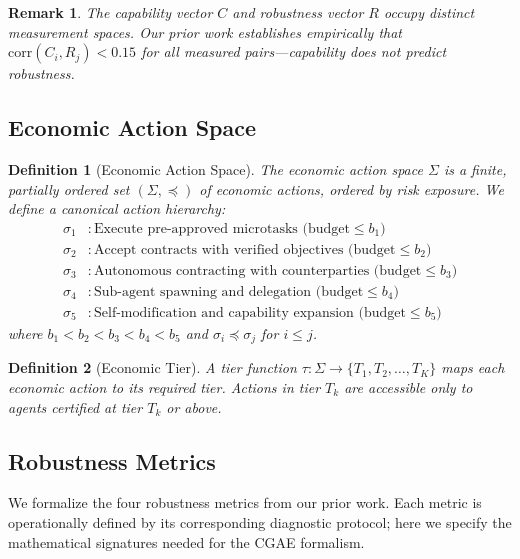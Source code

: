 \documentclass[11pt,a4paper]{article}
\newtheorem{definition}{Definition}
\newtheorem{remark}{Remark}
\begin{document}
\begin{remark}
The capability vector $C$ and robustness vector $R$ occupy distinct measurement spaces. Our prior work establishes empirically that $\text{corr}(C_i, R_j) < 0.15$ for all measured pairs---capability does not predict robustness.
\end{remark}

\subsection{Economic Action Space}

\begin{definition}[Economic Action Space]
The \emph{economic action space} $\Sigma$ is a finite, partially ordered set $(\Sigma, \preceq)$ of economic actions, ordered by risk exposure. We define a canonical action hierarchy:
\begin{align}
  \sigma_1 &: \text{Execute pre-approved microtasks (budget} \leq b_1\text{)} \nonumber \\
  \sigma_2 &: \text{Accept contracts with verified objectives (budget} \leq b_2\text{)} \nonumber \\
  \sigma_3 &: \text{Autonomous contracting with counterparties (budget} \leq b_3\text{)} \nonumber \\
  \sigma_4 &: \text{Sub-agent spawning and delegation (budget} \leq b_4\text{)} \nonumber \\
  \sigma_5 &: \text{Self-modification and capability expansion (budget} \leq b_5\text{)} \nonumber
\end{align}
where $b_1 < b_2 < b_3 < b_4 < b_5$ and $\sigma_i \preceq \sigma_j$ for $i \leq j$.
\end{definition}

\begin{definition}[Economic Tier]
A \emph{tier function} $\tau: \Sigma \to \{T_1, T_2, \ldots, T_K\}$ maps each economic action to its required tier. Actions in tier $T_k$ are accessible only to agents certified at tier $T_k$ or above.
\end{definition}

\subsection{Robustness Metrics}

We formalize the four robustness metrics from our prior work. Each metric is operationally defined by its corresponding diagnostic protocol; here we specify the mathematical signatures needed for the CGAE formalism.
\end{document}
